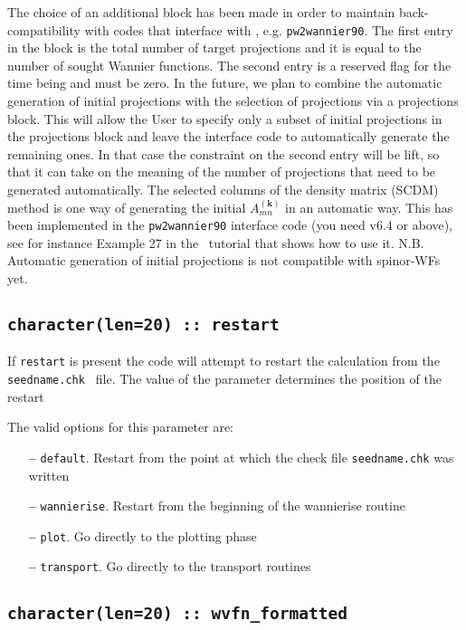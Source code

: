 The choice of an additional block has been made in order to maintain back-compatibility with codes that interface with \wannier, e.g. {\tt pw2wannier90}.
The first entry in the block is the total number of target projections and it is equal to the number of sought Wannier functions.
The second entry is a reserved flag for the time being and must be zero. In the future, we plan to combine the automatic generation of initial projections with the selection of projections via a projections block. This will allow the User to specify only a subset of initial projections in the projections block and leave the interface code to automatically generate the remaining ones. In that case the constraint on the second entry will be lift, so that it can take on the meaning of the number of projections that need to be generated automatically.
The selected columns of the density matrix (SCDM) method\cite{LinLin-ArXiv2017} is one way of generating the initial $A_{mn}^{(\mathbf{k})}$ in an automatic way. This has been implemented in the {\tt pw2wannier90} interface code (you need v6.4 or above), see for instance Example 27 in the \wannier\ tutorial that shows how to use it.
N.B. Automatic generation of initial projections is not compatible with spinor-WFs yet.

\subsection[restart]{\tt character(len=20) :: restart}

If \verb#restart# is present the code will attempt to restart the calculation
from the {\tt seedname.chk } file. The value of the parameter
determines the position of the restart

The valid options for this parameter are:
\begin{itemize}
\item[{\bf --}]  \verb#default#. Restart from the point at which the
  check file {\tt seedname.chk} was written
\item[{\bf --}]  \verb#wannierise#. Restart from the beginning of the
  wannierise routine
\item[{\bf --}]  \verb#plot#. Go directly to the plotting phase
\item[{\bf --}]  \verb#transport#. Go directly to the transport routines


\end{itemize}



\subsection[wvfn\_formated]{\tt character(len=20) :: wvfn\_formatted}

